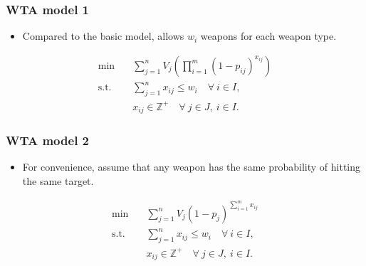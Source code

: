 \documentclass[CJK,10pt]{beamer}
\begin{document}
\begin{frame}
    \frametitle{WTA model 1}
    \begin{itemize}
        \item Compared to the basic model, allows $w_i$ weapons for each weapon type.
    \end{itemize}
    \begin{align*} \tag{S1}
        \min\quad & \sum_{j=1}^n V_j \left( \prod_{i=1}^m (1 -  p_{ij})^{x_{ij}} \right) \\ 
        \mathrm{s. t.}\quad &\sum_{j=1}^n x_{ij} \leq w_i\quad \forall ~i \in I,\\
        & x_{ij} \in \mathbb{Z}^+ \quad \forall~ j\in J , ~ i \in I.
    \end{align*}
    
\end{frame}

\begin{frame}
    \frametitle{WTA model 2}
    \begin{itemize}
        \item For convenience, assume that any weapon has the same probability of  hitting the same target.
    \end{itemize}
    \begin{align*} \tag{S2}
        \min\quad & \sum_{j=1}^n V_j (1-p_{j})^{\sum_{i=1}^m x_{ij}} \\ 
        \mathrm{s. t.}\quad &\sum_{j=1}^n x_{ij} \leq w_i\quad \forall ~i \in I,\\
        & x_{ij} \in \mathbb{Z}^+ \quad \forall~ j\in J , ~ i \in I.
    \end{align*}
\end{frame}
\end{document}
